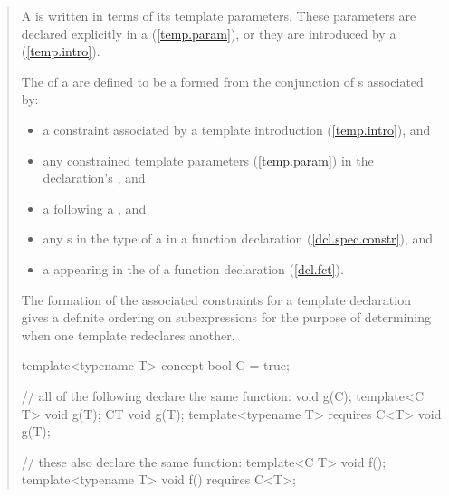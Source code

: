 \begin{quote}
\setcounter{Paras}{6}
\pnum
A  is written in terms of its template 
parameters. These parameters are declared explicitly in a 
 (\ref{temp.param}), or they are
introduced by a  (\ref{temp.intro}).


\pnum
The  of a  are 
defined to be a  formed from the conjunction 
of s associated by:
% 
\begin{itemize}
\item a constraint associated by a template introduction 
(\ref{temp.intro}), and

\item any constrained template parameters (\ref{temp.param}) in the 
declaration's , and

\item a  following a
, and

\item any s in the type of a 
 in a function declaration 
(\ref{dcl.spec.constr}), and

\item a  appearing in the  
of a function declaration (\ref{dcl.fct}).
\end{itemize}
% 
The formation of the associated constraints for a template declaration
gives a definite ordering on subexpressions for the purpose of determining
when one template redeclares another.

\enterexample
\begin{codeblock}
template<typename T> concept bool C = true;

// all of the following declare the same function:
void g(C);
template<C T> void g(T);
C{T} void g(T);
template<typename T> requires C<T> void g(T);

// these also declare the same function:
template<C T> void f();
template<typename T> void f() requires C<T>;
\end{codeblock}
\exitexample


\end{quote}
